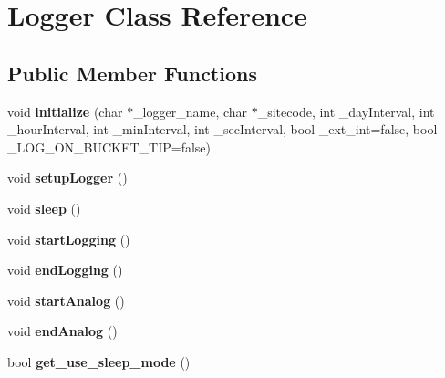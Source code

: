 \hypertarget{classLogger}{}\section{Logger Class Reference}
\label{classLogger}
\subsection*{Public Member Functions}
\begin{DoxyCompactItemize}
\item 
void {\bfseries initialize} (char $\ast$\+\_\+logger\+\_\+name, char $\ast$\+\_\+sitecode, int \+\_\+day\+Interval, int \+\_\+hour\+Interval, int \+\_\+min\+Interval, int \+\_\+sec\+Interval, bool \+\_\+ext\+\_\+int=false, bool \+\_\+\+L\+O\+G\+\_\+\+O\+N\+\_\+\+B\+U\+C\+K\+E\+T\+\_\+\+T\+IP=false)\hypertarget{classLogger_a9495e2c8e63850f3c7cfcc31e9d73ffe}{}\label{classLogger_a9495e2c8e63850f3c7cfcc31e9d73ffe}

\item 
void {\bfseries setup\+Logger} ()\hypertarget{classLogger_ab5e0bd543758c65a17b77553a0e9f0c9}{}\label{classLogger_ab5e0bd543758c65a17b77553a0e9f0c9}

\item 
void {\bfseries sleep} ()\hypertarget{classLogger_ad90ff8f29410f6b70cc6334391400a4e}{}\label{classLogger_ad90ff8f29410f6b70cc6334391400a4e}

\item 
void {\bfseries start\+Logging} ()\hypertarget{classLogger_a4a6c78dd1715b33ae4bbd6f66f116f77}{}\label{classLogger_a4a6c78dd1715b33ae4bbd6f66f116f77}

\item 
void {\bfseries end\+Logging} ()\hypertarget{classLogger_aa82814d61687debcf3b8dd6f46c9d549}{}\label{classLogger_aa82814d61687debcf3b8dd6f46c9d549}

\item 
void {\bfseries start\+Analog} ()\hypertarget{classLogger_af936c7f58e23316abb5614cbd31c7ced}{}\label{classLogger_af936c7f58e23316abb5614cbd31c7ced}

\item 
void {\bfseries end\+Analog} ()\hypertarget{classLogger_adca7be8a63592263c67f63766680d16f}{}\label{classLogger_adca7be8a63592263c67f63766680d16f}

\item 
bool {\bfseries get\+\_\+use\+\_\+sleep\+\_\+mode} ()\hypertarget{classLogger_acc758b6fdaac8099c492929aa7f1691d}{}\label{classLogger_acc758b6fdaac8099c492929aa7f1691d}


\end{DoxyCompactItemize}
